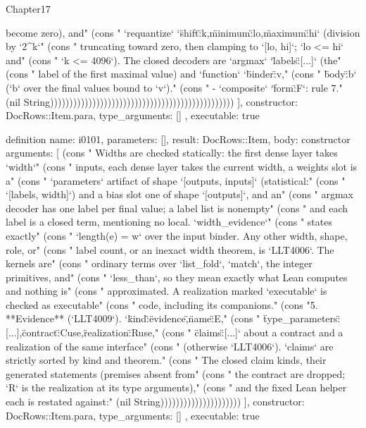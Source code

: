 \begin{lexlean}{Chapter17}
\begin{semanticmodule}
{{become zero), and" (cons "     `requantize` `{\"shift\":k,\"minimum\":lo,\"maximum\":hi}` (division by `2^k`" (cons "     truncating toward zero, then clamping to `[lo, hi]`; `lo <= hi` and" (cons "     `k <= 4096`). The closed decoders are `argmax` `{\"labels\":[...]}` (the" (cons "     label of the first maximal value) and `function` `{\"binder\":v," (cons "     \"body\":b}` (`b` over the final values bound to `v`)." (cons "   - `composite` `{\"form\":F}`: rule 7." (nil String))))))))))))))))))))))))))))))))))))))))))))))))
    ],
    constructor: DocRows::Item.para,
    type_arguments: []
  },
  executable: true
}

definition{
  name: i0101,
  parameters: [],
  result: DocRows::Item,
  body: constructor{
    arguments: [
      (cons "   Widths are checked statically: the first dense layer takes `width`" (cons "   inputs, each dense layer takes the current width, a weights slot is a" (cons "   `parameters` artifact of shape `[outputs, inputs]` (statistical:" (cons "   `[labels, width]`) and a bias slot one of shape `[outputs]`, and an" (cons "   argmax decoder has one label per final value; a label list is nonempty" (cons "   and each label is a closed term, mentioning no local. `width_evidence`" (cons "   states exactly" (cons "   `length(e) = w` over the input binder. Any other width, shape, role, or" (cons "   label count, or an inexact width theorem, is `LLT4006`. The kernels are" (cons "   ordinary terms over `list_fold`, `match`, the integer primitives, and" (cons "   `less_than`, so they mean exactly what Lean computes and nothing is" (cons "   approximated. A realization marked `executable` is checked as executable" (cons "   code, including its companions." (cons "5. **Evidence** (`LLT4009`). `{\"kind\":\"evidence\",\"name\":E," (cons "   \"type_parameters\":[...],\"contract\":Cuse,\"realization\":Ruse," (cons "   \"claims\":[...]}` about a contract and a realization of the same interface" (cons "   (otherwise `LLT4006`). `claims` are strictly sorted by kind and theorem." (cons "   The closed claim kinds, their generated statements (premises absent from" (cons "   the contract are dropped; `R` is the realization at its type arguments)," (cons "   and the fixed Lean helper each is restated against:" (nil String)))))))))))))))))))))
    ],
    constructor: DocRows::Item.para,
    type_arguments: []
  },
  executable: true
}


\end{semanticmodule}
\end{lexlean}
